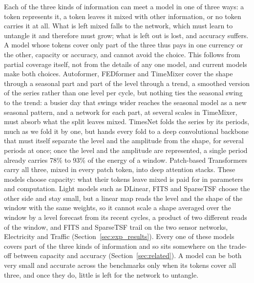 {
Each of the three kinds of information can meet a model in one of three ways: a token represents it, a token leaves it mixed with other information, or no token carries it at all. What is left mixed falls to the network, which must learn to untangle it and therefore must grow; what is left out is lost, and accuracy suffers. A model whose tokens cover only part of the three thus pays in one currency or the other, capacity or accuracy, and cannot avoid the choice. This follows from partial coverage itself, not from the details of any one model, and current models make both choices. Autoformer, FEDformer and TimeMixer cover the shape through a seasonal part and part of the level through a trend, a smoothed version of the series rather than one level per cycle, but nothing ties the seasonal swing to the trend: a busier day that swings wider reaches the seasonal model as a new seasonal pattern, and a network for each part, at several scales in TimeMixer, must absorb what the split leaves mixed. TimesNet folds the series by its periods, much as we fold it by one, but hands every fold to a deep convolutional backbone that must itself separate the level and the amplitude from the shape, for several periods at once; once the level and the amplitude are represented, a single period already carries 78\% to 93\% of the energy of a window. Patch-based Transformers carry all three, mixed in every patch token, into deep attention stacks. These models choose capacity: what their tokens leave mixed is paid for in parameters and computation. Light models such as DLinear, FITS and SparseTSF choose the other side and stay small, but a linear map reads the level and the shape of the window with the same weights, so it cannot scale a shape averaged over the window by a level forecast from its recent cycles, a product of two different reads of the window, and FITS and SparseTSF trail on the two sensor networks, Electricity and Traffic (Section~\ref{sec:exp_results}). Every one of these models covers part of the three kinds of information and so sits somewhere on the trade-off between capacity and accuracy (Section~\ref{sec:related}). A model can be both very small and accurate across the benchmarks only when its tokens cover all three, and once they do, little is left for the network to untangle.

}
